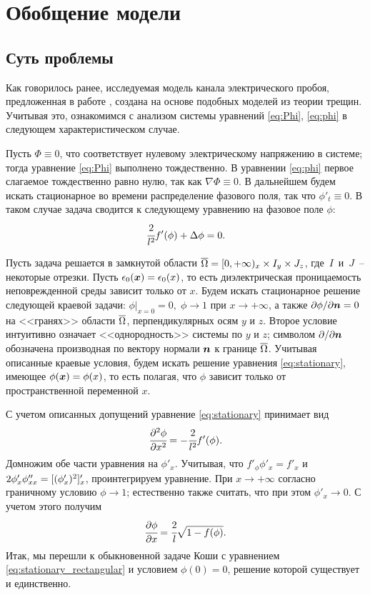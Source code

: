 
\section{Обобщение модели}

\subsection{Суть проблемы}
\label{ssec:matter_of_problem}

Как говорилось ранее, исследуемая модель канала электрического пробоя, предложенная в работе \cite{pitike_dielectric_breakdown}, создана на основе подобных моделей из теории трещин. Учитывая это, ознакомимся с анализом системы уравнений \eqref{eq:Phi}, \eqref{eq:phi} в следующем характеристическом случае.

Пусть $\Phi \equiv 0$, что соответствует нулевому электрическому напряжению в системе; тогда уравнение \eqref{eq:Phi} выполнено тождественно. В уравнении \eqref{eq:phi} первое слагаемое тождественно равно нулю, так как $\nabla \Phi \equiv 0$. В дальнейшем будем искать стационарное во времени распределение фазового поля, так что $\phi'_t \equiv 0$. В таком случае задача сводится к следующему уравнению на фазовое поле $\phi$:
\begin{equation}
	\cfrac{2}{l^2} f'(\phi) + \Delta \phi = 0 {\text{.}}
	\label{eq:stationary}
\end{equation}

Пусть задача решается в замкнутой области ${\overline{\Omega}} = [0, +\infty)_x \times I_y \times J_z$, где~$I$~и~$J$~-- некоторые отрезки. Пусть $\epsilon_0({\boldsymbol{x}}) = \epsilon_0(x)$, то есть диэлектрическая проницаемость неповрежденной среды зависит только от $x$. Будем искать стационарное решение следующей краевой задачи: $\phi|_{x = 0} = 0, \; \phi \to 1$ при $x \to +\infty$, а также $\partial \phi / \partial {\boldsymbol{n}} = 0$ на <<гранях>> области ${\overline{\Omega}}$, перпендикулярных осям $y$ и $z$. Второе условие интуитивно означает <<однородность>> системы по $y$ и $z$; символом $\partial  / \partial {\boldsymbol{n}}$ обозначена производная по вектору нормали ${\boldsymbol{n}}$ к границе ${\overline{\Omega}}$. Учитывая описанные краевые условия, будем искать решение уравнения \eqref{eq:stationary}, имеющее $\phi({\boldsymbol{x}}) = \phi(x)$, то есть полагая, что $\phi$ зависит только от пространственной переменной $x$.

С учетом описанных допущений уравнение \eqref{eq:stationary} принимает вид
$$\cfrac{\partial^2 \phi}{\partial {x}^2} = -\cfrac{2}{l^2} f'(\phi) {\text{.}}$$
Домножим обе части уравнения на $\phi'_x$. Учитывая, что $f'_\phi \phi'_x = f'_x$ и $2 \phi'_x \phi''_{xx} \hm = [(\phi'_x)^2]'_x$, проинтегрируем уравнение. При $x \to +\infty$ согласно граничному условию $\phi \to 1$; естественно также считать, что при этом $\phi'_x \to 0$. С учетом этого получим
\begin{equation}
	\cfrac{\partial \phi}{\partial x} = \cfrac{2}{l} \sqrt{1 - f(\phi)} {\text{.}}
	\label{eq:stationary_rectangular}
\end{equation}
Итак, мы перешли к обыкновенной задаче Коши с уравнением \eqref{eq:stationary_rectangular} и условием $\phi(0) = 0$, решение которой существует и единственно.

